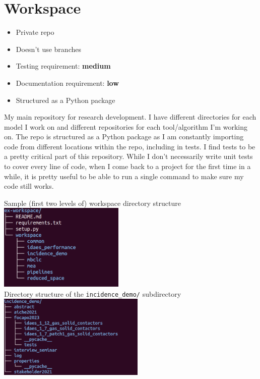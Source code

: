 \documentclass{article}
\begin{document}
\section{Workspace}
\begin{itemize}
  \item Private repo
  \item Doesn't use branches
  \item Testing requirement: {\color{purple}\bf medium}
  \item Documentation requirement: {\color{blue}\bf low}
  \item Structured as a Python package
\end{itemize}
My main repository for research development. I have different
directories for each model I work on and different repositories for
each tool/algorithm I'm working on.
The repo is structured as a Python package as I am constantly
importing code from different locations within the repo,
including in tests.
I find tests to be a pretty critical part of this repository. While
I don't necessarily write unit tests to cover every line of code,
when I come back to a project for the first time in a while, it is
pretty useful to be able to run a single command to make sure
my code still works.
\begin{center}
  Sample (first two levels of) workspace directory structure\\
  \includegraphics[width=6cm]{workspace_tree.png}
  \\
  Directory structure of the \texttt{incidence\_demo/} subdirectory
  \includegraphics[width=7cm]{incidence_demo_tree.png}
\end{center}
\end{document}
